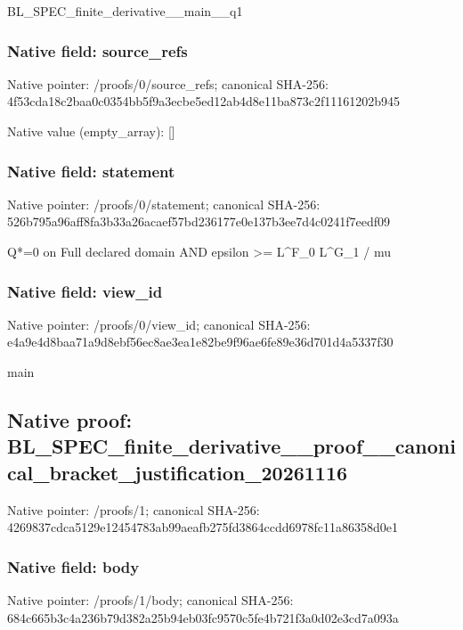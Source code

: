 \documentclass[10pt,a4paper]{article}
\begin{document}
\begingroup\raggedright\sloppy BL\_\allowbreak{}SPEC\_\allowbreak{}finite\_\allowbreak{}derivative\_\allowbreak{}\_\allowbreak{}main\_\allowbreak{}\_\allowbreak{}q1\par\endgroup

\subsubsection{Native field: source\_\allowbreak{}refs}
Native pointer: /proofs/0/source\_\allowbreak{}refs; canonical SHA-256: 4f53cda18c2baa0c0354bb5f9a3ecbe5ed12ab4d8e11ba873c2f11161202b945

Native value (empty\_\allowbreak{}array): []

\subsubsection{Native field: statement}
Native pointer: /proofs/0/statement; canonical SHA-256: 526b795a96aff8fa3b33a26acaef57bd236177e0e137b3ee7d4c0241f7eedf09

\begingroup\raggedright\sloppy Q*=\allowbreak{}0 on Full declared domain AND epsilon >=\allowbreak{} L\textasciicircum{}F\_\allowbreak{}0 L\textasciicircum{}G\_\allowbreak{}1 /\allowbreak{} mu\par\endgroup

\subsubsection{Native field: view\_\allowbreak{}id}
Native pointer: /proofs/0/view\_\allowbreak{}id; canonical SHA-256: e4a9e4d8baa71a9d8ebf56ec8ae3ea1e82be9f96ae6fe89e36d701d4a5337f30

\begingroup\raggedright\sloppy main\par\endgroup

\subsection{Native proof: BL\_\allowbreak{}SPEC\_\allowbreak{}finite\_\allowbreak{}derivative\_\allowbreak{}\_\allowbreak{}proof\_\allowbreak{}\_\allowbreak{}canonical\_\allowbreak{}bracket\_\allowbreak{}justification\_\allowbreak{}20261116}
Native pointer: /proofs/1; canonical SHA-256: 4269837cdca5129e12454783ab99aeafb275fd3864ccdd6978fc11a86358d0e1

\subsubsection{Native field: body}
Native pointer: /proofs/1/body; canonical SHA-256: 684c665b3c4a236b79d382a25b94eb03fc9570c5fe4b721f3a0d02e3cd7a093a
\end{document}
